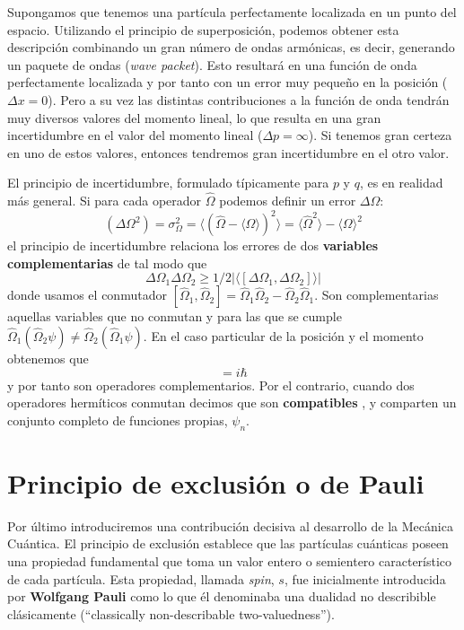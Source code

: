 Supongamos que tenemos una partícula perfectamente 
localizada en un punto del espacio. Utilizando el
principio de superposición, podemos obtener esta 
descripción combinando un gran número de ondas 
armónicas, es decir, generando un paquete de
ondas (\textit{wave packet}). Esto resultará en una
función de onda perfectamente localizada y por tanto
con un error muy pequeño en la posición ($\Delta x=0$).
Pero a su vez las distintas contribuciones a la función 
de onda tendrán muy diversos valores del momento lineal, 
lo que resulta en una gran incertidumbre en el valor 
del momento lineal ($\Delta p=\infty$). Si tenemos gran
certeza en uno de estos valores, entonces
tendremos gran incertidumbre en el otro valor.

El principio de incertidumbre, formulado típicamente para
$p$ y $q$, es en realidad más general. Si para cada 
operador $\hat{\Omega}$ podemos definir un error $\Delta\Omega$:
\begin{equation}
    (\Delta\Omega^2)=\sigma^2_\Omega=\langle (\hat{\Omega} - \langle \Omega\rangle)^2 \rangle=
    \langle\hat{\Omega}^2\rangle - \langle\Omega\rangle^2
\end{equation}
el principio de incertidumbre relaciona los errores de dos
\textbf{variables complementarias} de tal modo que
\begin{equation}
\Delta\Omega_1\Delta\Omega_2\geq
1/2|\langle[\Delta\Omega_1,\Delta\Omega_2]\rangle|
\end{equation}
donde  usamos el conmutador  $[\hat{\Omega}_1,\hat{\Omega}_2] =
\hat{\Omega}_1\hat{\Omega}_2 -\hat{\Omega}_2\hat{\Omega}_1$.
Son complementarias aquellas variables que no conmutan y para
las que se cumple 
$\hat{\Omega}_1(\hat{\Omega}_2\psi)\neq\hat{\Omega}_2(\hat{\Omega}_1\psi)$.
En el caso particular de la posición y el momento obtenemos que
\begin{equation}
    [\hat{x},\hat{p}_x] = i\hbar
\end{equation}
y por tanto son operadores
complementarios. Por el contrario, cuando
dos operadores hermíticos conmutan decimos 
que son \textbf{compatibles }, y comparten un conjunto
completo de funciones propias, $\psi_n$.

\section{Principio de exclusión o de Pauli}
Por último introduciremos una contribución decisiva
al desarrollo de la Mecánica Cuántica. El principio de
exclusión establece que las partículas cuánticas poseen una 
propiedad fundamental que toma un valor entero o semientero 
característico de cada partícula. Esta propiedad, 
llamada \textit{spin}, $s$, fue inicialmente introducida
por \textbf{Wolfgang Pauli} como lo que él denominaba una
dualidad no
describible clásicamente (``classically non-describable
two-valuedness'').

